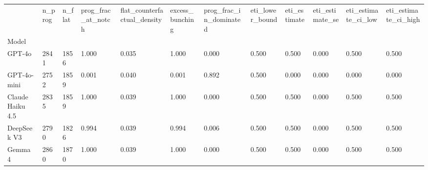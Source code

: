 \begin{tabular}{llllllllllll}
\toprule
 & n_prog & n_flat & prog_frac_at_notch & flat_counterfactual_density & excess_bunching & prog_frac_in_dominated & eti_lower_bound & eti_estimate & eti_estimate_se & eti_estimate_ci_low & eti_estimate_ci_high \\
Model &  &  &  &  &  &  &  &  &  &  &  \\
\midrule
GPT-4o & 2841 & 1856 & 1.000 & 0.035 & 1.000 & 0.000 & 0.500 & 0.500 & 0.000 & 0.500 & 0.500 \\
GPT-4o-mini & 2752 & 1859 & 0.001 & 0.040 & 0.001 & 0.892 & 0.500 & 0.000 & 0.000 & 0.000 & 0.000 \\
Claude Haiku 4.5 & 2835 & 1859 & 1.000 & 0.039 & 1.000 & 0.000 & 0.500 & 0.500 & 0.000 & 0.500 & 0.500 \\
DeepSeek V3 & 2790 & 1826 & 0.994 & 0.039 & 0.994 & 0.006 & 0.500 & 0.500 & 0.000 & 0.500 & 0.500 \\
Gemma 4 & 2860 & 1870 & 1.000 & 0.039 & 1.000 & 0.000 & 0.500 & 0.500 & 0.000 & 0.500 & 0.500 \\
\bottomrule
\end{tabular}
